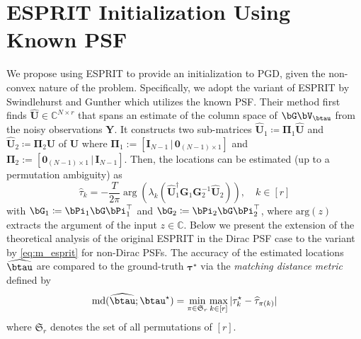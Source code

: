 \documentclass[conference,english]{IEEEtran}
\begin{document}
\section{ESPRIT Initialization Using Known PSF}\label{sec:esprit}
We propose using ESPRIT \cite{roy1989esprit} to provide an initialization to PGD, given the non-convex nature of the problem. Specifically, we adopt the variant of ESPRIT by Swindlehurst and Gunther \cite{swindlehurst1999methods}
which utilizes the known PSF. 
Their method first finds $\widehat{\bm U} \in \mathbb{C}^{N \times r}$ that spans an estimate of the column space of $\bG \bV_{\btau}$ from the noisy observations $\bm{Y}$. 
It constructs two sub-matrices $\widehat{\bm U}_1 \coloneqq \bm{\Pi}_1 \widehat{\bm U}$ and $ \widehat{\bm U}_2 \coloneqq \bm{\Pi}_2 \widehat{\bm U}$ of $\widehat{\bm U}$ where $\bm{\Pi}_1:= \left[\bm{I}_{N-1} \,|\, \bm{0}_{(N-1)\times 1} \right]$ and $\bm{\Pi}_2 := \left[ \bm{0}_{(N-1)\times 1} \,|\, \bm{I}_{N-1} \right]$. 
Then, the locations can be estimated (up to a permutation ambiguity) as
\begin{equation}
\label{eq:m_esprit}
\widehat{\tau}_k = - \frac{T}{2\pi} \arg(\lambda_k(\widehat{\bm U}_1^\dagger \bm{G}_1\bm{G}_2^{-1}\widehat{\bm U}_2)), \quad k \in [r] 
\end{equation}
with $\bG_1 \coloneqq \bPi_1 \bG \bPi_1^\top$ and $\bG_2 \coloneqq \bPi_2 \bG \bPi_2^\top$, where $\mathrm{arg}(z)$ extracts the argument of the input $z \in \mathbb{C}$. 
Below we present the extension of the theoretical analysis of the original ESPRIT \cite{roy1989esprit} in the Dirac PSF case \cite{li2022stability} to the variant by \eqref{eq:m_esprit} for non-Dirac PSFs.
The accuracy of the estimated locations $\widehat{\btau}$ are
compared to the ground-truth $\bm\tau^\star$ via the
\emph{matching distance metric} defined by
\begin{align*}
\mathrm{md}(\widehat{\btau} ; \btau^\star) = \min_{\pi \in \mathfrak{S}_r} \max_{k \in [r]}  \vert \tau^\star_k - \widehat{\tau}_{\pi(k)} \vert
\end{align*}
where $\mathfrak{S}_r$ denotes the set of all permutations of $[r]$.
\end{document}
